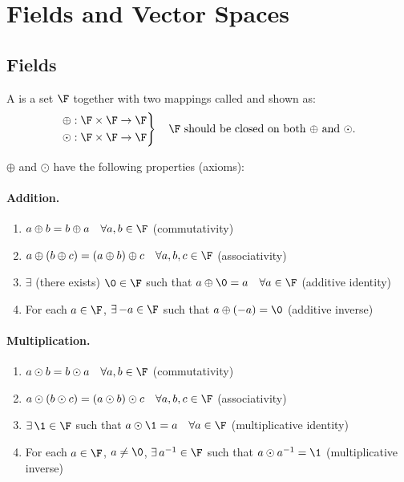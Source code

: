 \section{Fields and Vector Spaces}\label{sec:fields-vs}

\subsection{Fields}\label{ss:fields}

\begin{definition}
A  is a set $\F$ together with two mappings called  and  shown as:
\[
\left.\begin{aligned}
\oplus &: \F\times\F\to\F\\
\odot &: \F\times\F\to\F
\end{aligned}\right\}\quad \text{$\F$ should be closed on both $\oplus$ and $\odot$.}
\]
\end{definition}

$\oplus$ and $\odot$ have the following properties (axioms):

\paragraph{Addition.}
\begin{enumerate}[label=(A\arabic*),leftmargin=3.2em]
\item $a\oplus b = b\oplus a \quad \forall a,b\in\F$ \hfill (commutativity)
\item $a\oplus(b\oplus c) = (a\oplus b)\oplus c \quad \forall a,b,c\in\F$ \hfill (associativity)
\item $\exists$ (there exists) $\0\in\F$ such that $a\oplus \0 = a \quad \forall a\in\F$ \hfill (additive identity)
\item For each $a\in\F$, $\exists\,{-a}\in\F$ such that $a\oplus(-a) = \0$ \hfill (additive inverse)
\end{enumerate}

\paragraph{Multiplication.}
\begin{enumerate}[label=(M\arabic*),leftmargin=3.2em]
\item $a\odot b = b\odot a \quad \forall a,b\in\F$ \hfill (commutativity)
\item $a\odot(b\odot c) = (a\odot b)\odot c \quad \forall a,b,c\in\F$ \hfill (associativity)
\item $\exists\,\1\in\F$ such that $a\odot \1 = a \quad \forall a\in\F$ \hfill (multiplicative identity)
\item For each $a\in\F$, $a\neq \0$, $\exists\,a^{-1}\in\F$ such that $a\odot a^{-1} = \1$ \hfill (multiplicative inverse)
\end{enumerate}

